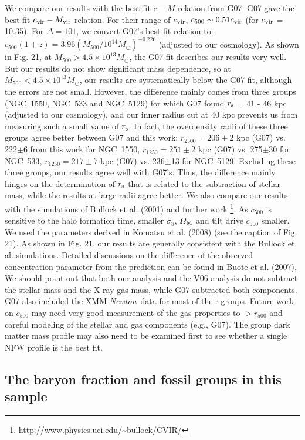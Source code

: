 \documentclass{aastex}
\def\xmm        {XMM-{\em Newton}\/}
\begin{document}
We compare our results with the best-fit $c - M$ relation from G07.
G07 gave the best-fit $c_{\rm vir} - M_{\rm vir}$ relation. For their range of
$c_{\rm vir}$, $c_{500} \sim 0.51 c_{\rm vir}$ (for $c_{\rm vir}$ = 10.35). For
$\Delta=101$, we convert G07's best-fit relation to: $c_{500} (1+z) = 
3.96 (M_{500}/10^{14} M_{\odot})^{-0.226}$ (adjusted to our cosmology).
As shown in Fig. 21, at $M_{500} > 4.5\times10^{13} M_{\odot}$, the G07 fit
describes our results very well. But our results do not show significant mass
dependence, so at $M_{500} < 4.5\times10^{13} M_{\odot}$, our results are
systematically below the G07 fit, although the errors are not small. 
However, the difference mainly comes from three groups (NGC~1550, NGC~533 and NGC~5129)
for which G07 found $r_{\rm s}$ = 41 - 46 kpc (adjusted to our cosmology), and our
inner radius cut at 40 kpc prevents us from measuring such a small value of $r_{\rm s}$.
In fact, the overdensity radii
of these three groups agree better between G07 and this work:
$r_{2500} = 206\pm2$ kpc (G07) vs. 222$\pm$6 from this work for NGC~1550,
$r_{1250} = 251\pm2$ kpc (G07) vs. 275$\pm$30 for NGC~533,
$r_{1250} = 217\pm7$ kpc (G07) vs. 236$\pm$13 for NGC~5129.
Excluding these three groups, our results agree well with G07's. Thus, the difference
mainly hinges on the determination of $r_{\rm s}$ that is related to the subtraction
of stellar mass, while the results at large radii agree better.
We also compare our results with the simulations of Bullock et al. (2001) and further work
\footnote{http://www.physics.uci.edu/\~{{}}bullock/CVIR/}. As $c_{500}$ is sensitive
to the halo formation time, smaller $\sigma_{8}$, $\Omega$$_{\rm M}$ and tilt
drive $c_{500}$ smaller. We used the parameters derived in Komatsu et al. (2008)
(see the caption of Fig. 21). As shown in Fig. 21, our results are generally consistent with
the Bullock et al. simulations. Detailed discussions on the difference of the observed
concentration parameter from the prediction can be found in Buote et al. (2007).
We should point out that both our analysis and the V06 analysis do not subtract the
stellar mass and the X-ray gas mass, while G07 subtracted both components.
G07 also included the \xmm\ data for most of their groups.
Future work on $c_{500}$ may need very good measurement of the gas properties to $> r_{500}$
and careful modeling of the stellar and gas components (e.g., G07). The group dark matter
mass profile may also need to be examined first to see whether a single NFW profile
is the best fit.

\subsection{The baryon fraction and fossil groups in this sample}
\end{document}
